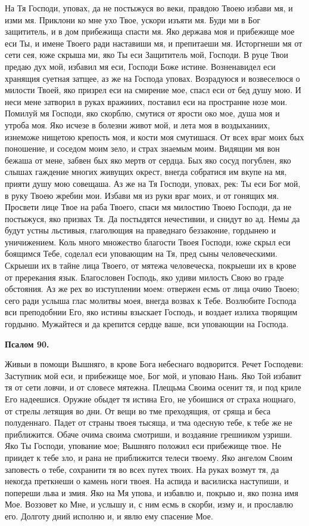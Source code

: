 На Тя Господи, уповах, да не постыжуся во веки, правдою Твоею избави мя, и изми мя. Приклони ко мне ухо Твое, ускори изъяти мя. Буди ми в Бог защититель, и в дом прибежища спасти мя. Яко держава моя и прибежище мое еси Ты, и имене Твоего ради наставиши мя, и препитаеши мя. Исторгнеши мя от сети сея, юже скрыша ми, яко Ты еси Защититель мой, Господи. В руце Твои предаю дух мой, избавил мя еси, Господи Боже истине. Возненавидел еси хранящия суетная затщее, аз же на Господа уповах. Возрадуюся и возвеселюся о милости Твоей, яко призрел еси на смирение мое, спасл еси от бед душу мою. И неси мене затворил в руках вражииих, поставил еси на пространне нозе мои. Помилуй мя Господи, яко скорблю, смутися от ярости око мое, душа моя и утроба моя. Яко исчезе в болезни живот мой, и лета моя в воздыханиих, изнеможе нищетою крепость моя, и кости моя смутишася. От всех враг моих бых поношение, и соседом моим зело, и страх знаемым моим. Видящии мя вон бежаша от мене, забвен бых яко мертв от сердца. Бых яко сосуд погублен, яко слышах гаждение многих живущих окрест, внегда собратися им вкупе на мя, прияти душу мою совещаша. Аз же на Тя Господи, уповах, рек: Ты еси Бог мой, в руку Твоею жребии мои. Избави мя из руки враг моих, и от гонящих мя. Просвети лице Твое на раба Твоего, спаси мя милостию Твоею Господи, да не постыжуся, яко призвах Тя. Да постыдятся нечестивии, и снидут во ад. Немы да будут устны льстивыя, глаголющия на праведнаго беззаконие, гордынею и уничижением. Коль много множество благости Твоея Господи, юже скрыл еси боящимся Тебе, соделал еси уповающим на Тя, пред сыны человеческими. Скрыеши их в тайне лица Твоего, от мятежа человеческа, покрыеши их в крове от пререкания язык. Благословен Господь, яко удиви милость Свою во граде обстояния. Аз же рех во изступлении моем: отвержен есмь от лица очию Твоею; сего ради услыша глас молитвы моея, внегда возвах к Тебе. Возлюбите Господа вси преподобнии Его, яко истины взыскает Господь, и воздает излиха творящим гордыню. Мужайтеся и да крепится сердце ваше, вси уповающии на Господа.


\medskip


\bfseries Псалом 90.\normalfont{}


Живыи в помощи Вышняго, в крове Бога небеснаго водворится. Речет Господеви: Заступник мой еси, и прибежище мое, Бог мой, и уповаю Нань. Яко Той избавит тя от сети ловчи, и от словесе мятежна. Плещьма Своима осенит тя, и под криле Его надеешися. Оружие обыдет тя истина Его, не убоишися от страха нощнаго, от стрелы летящия во дни. От вещи во тме преходящия, от сряща и беса полуденнаго. Падет от страны твоея тысяща, и тма одесную тебе, к тебе же не приближится. Обаче очима своима смотриши, и воздаяние грешииком узриши. Яко Ты Господи, упование  мое; Вышняго положил еси прибежище твое. Не приидет к тебе зло, и рана не приближится телеси твоему. Яко ангелом Своим заповесть о тебе, сохранити тя во всех путех твоих. На руках возмут тя, да некогда преткнеши о камень ноги твоея. На аспида и василиска наступиши, и попереши льва и змия. Яко на Мя упова, и избавлю и, покрыю и, яко позна имя Мое. Воззовет ко Мне, и услышу и, с ним есмь в скорби, изму и, и прославлю его. Долготу дний исполню и, и явлю ему спасение Мое.


